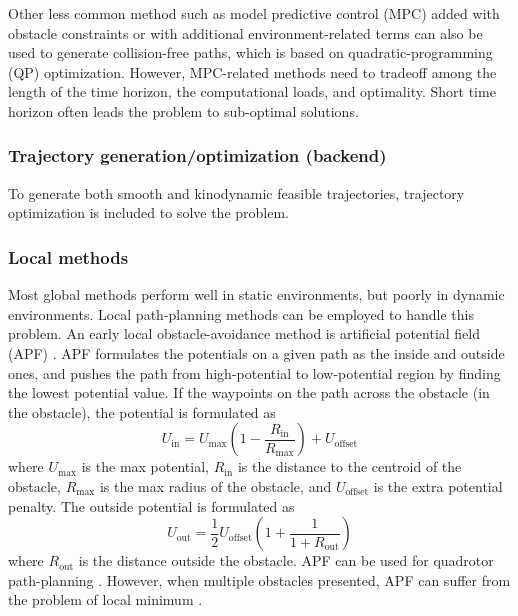 \documentclass[letterpaper,journal,twoside]{IEEEtran}
\begin{document}
Other less common method such as model predictive 
control (MPC) added with obstacle constraints or with 
additional environment-related 
terms \cite{park2009obstacle,ji2016path}  can also be 
used to generate collision-free paths, which is based on 
quadratic-programming (QP) optimization. 
However, MPC-related methods need to tradeoff among the 
length of the time horizon, the computational loads, and 
optimality. Short time horizon often leads the problem to 
sub-optimal solutions.




\subsubsection{Trajectory generation/optimization (backend)}
To generate both smooth and kinodynamic feasible 
trajectories, trajectory optimization is included to 
solve the problem.

\subsubsection{Local methods}
Most global methods perform well in static environments, 
but poorly in dynamic environments. 
Local path-planning methods can be employed to handle 
this problem. 
An early local obstacle-avoidance method is artificial 
potential field (APF) \cite{warren1989global}.
APF formulates the potentials on a given path as the 
inside and outside ones, and pushes the path from 
high-potential to low-potential region by finding the 
lowest potential value. 
If the waypoints on the path across the 
obstacle (in the obstacle), the potential is formulated as 
\begin{equation}
\label{eq:APF_in}
U_{\text{in}} = 
U_{\text{max}}(1 - \frac{R_{\text{in}}}{R_{\text{max}}}) + 
U_{\text{offset}}
\end{equation}
where $U_{\text{max}}$ is the max potential, 
$R_{\text{in}}$ is the distance to the centroid of the 
obstacle, $R_{\text{max}}$ is the max radius of the 
obstacle, and $U_{\text{offset}}$ is the extra 
potential penalty.
The outside potential is formulated as 
\begin{equation}
\label{eq:APF_out}
U_{\text{out}} = 
\frac{1}{2}U_{\text{offset}}(1+ \frac{1}{1+R_\text{out}})
\end{equation}
where $R_{\text{out}}$ is the distance outside the obstacle.
APF can be used for quadrotor path-planning \cite{chen2016uav}.
However, when multiple obstacles presented, APF can suffer 
from the problem of local minimum \cite{koren1991potential}.
\end{document}
